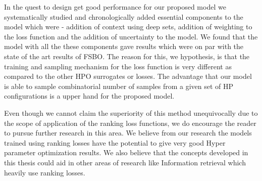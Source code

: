 \documentclass[12pt, twoside, ngerman]{report}
\begin{document}
In the quest to design get good performance for our proposed model we systematically studied and chronologically added essential components to the model which were - addition of context using deep sets,  addition of weighting to the loss function and the addition of uncertainty to the model.
We found that the model with all the these components gave results which were on par with the state of the art results of FSBO.
The reason for this,  we hypothesis, is that the training and sampling mechanism for the loss function is very different as compared to the other HPO surrogates or losses.
The advantage that our model is able to sample combinatorial number of samples from a given set of HP configurations is a upper hand for the proposed model.

Even though we cannot claim the superiority of this method unequivocally due to the scope of application of the ranking loss functions,  we do encourage the reader to pursue further research in this area. 
We believe from our research the models trained using ranking losses have the potential to give very good Hyper parameter optimization results.
We also believe that the concepts developed in this thesis could aid in other areas of research like Information retrieval which heavily use ranking losses.

\end{document}
